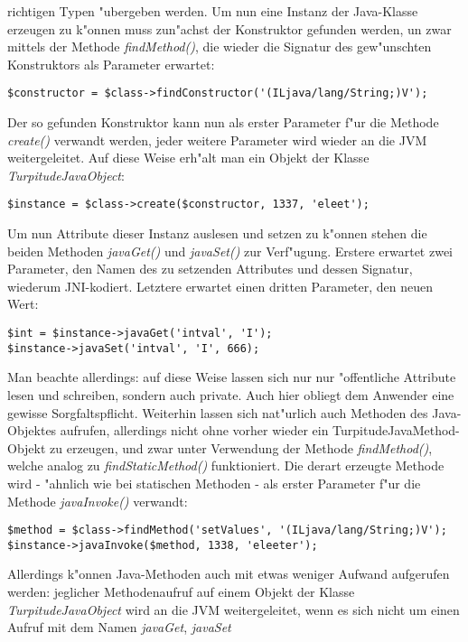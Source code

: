richtigen Typen "ubergeben werden.
Um nun eine Instanz der Java-Klasse erzeugen zu k"onnen muss zun"achst der Konstruktor
gefunden werden, un zwar mittels der Methode \emph{findMethod()}, die wieder die Signatur
des gew"unschten Konstruktors als Parameter erwartet:
\begin{lstlisting}[caption=Konstruktoren finden]
$constructor = $class->findConstructor('(ILjava/lang/String;)V');
\end{lstlisting}
Der so gefunden Konstruktor kann nun als erster Parameter f"ur die Methode \emph{create()}
verwandt werden, jeder weitere Parameter wird wieder an die JVM weitergeleitet. Auf diese
Weise erh"alt man ein Objekt der Klasse \emph{TurpitudeJavaObject}:
\begin{lstlisting}[caption=Konstruktoren finden]
$instance = $class->create($constructor, 1337, 'eleet');
\end{lstlisting}
Um nun Attribute dieser Instanz auslesen und setzen zu k"onnen stehen die beiden Methoden
\emph{javaGet()} und \emph{javaSet()} zur Verf"ugung. Erstere erwartet zwei Parameter, den
Namen des zu setzenden Attributes und dessen Signatur, wiederum JNI-kodiert. Letztere erwartet
einen dritten Parameter, den neuen Wert:
\begin{lstlisting}[caption=Attribute lesen und schreiben]
$int = $instance->javaGet('intval', 'I');
$instance->javaSet('intval', 'I', 666);
\end{lstlisting}
Man beachte allerdings: auf diese Weise lassen sich nur nur "offentliche Attribute lesen
und schreiben, sondern auch private. Auch hier obliegt dem Anwender eine gewisse Sorgfaltspflicht.
Weiterhin lassen sich nat"urlich auch Methoden des Java-Objektes aufrufen, allerdings nicht ohne
vorher wieder ein TurpitudeJavaMethod-Objekt zu erzeugen, und zwar unter Verwendung der
Methode \emph{findMethod()}, welche analog zu \emph{findStaticMethod()} funktioniert. Die derart
erzeugte Methode wird - "ahnlich wie bei statischen Methoden - als erster Parameter f"ur die
Methode \emph{javaInvoke()} verwandt:
\begin{lstlisting}[caption=Methoden aufrufen]
$method = $class->findMethod('setValues', '(ILjava/lang/String;)V');
$instance->javaInvoke($method, 1338, 'eleeter');
\end{lstlisting}
Allerdings k"onnen Java-Methoden auch mit etwas weniger Aufwand aufgerufen werden:
jeglicher Methodenaufruf auf einem Objekt der Klasse \emph{TurpitudeJavaObject} wird an die
JVM weitergeleitet, wenn es sich nicht um einen Aufruf mit dem Namen \emph{javaGet}, \emph{javaSet}
